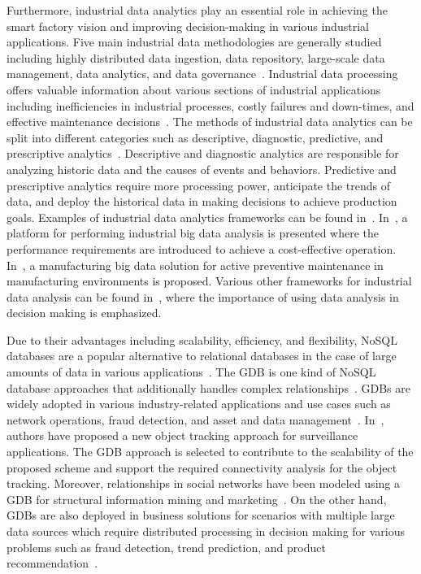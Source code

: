 Furthermore, industrial data analytics play an essential role in achieving the smart factory vision and improving decision-making in various industrial applications. Five main industrial data methodologies are generally studied including highly distributed data ingestion, data repository, large-scale data management, data analytics, and data governance~\cite{DBLP:journals/corr/abs-1807-01016}. Industrial data processing offers valuable information about various sections of industrial applications including inefficiencies in industrial processes, costly failures and down-times, and effective maintenance decisions~\cite{JLee-BigData, Raptis2019}.  The methods of industrial data analytics can be split into different categories such as descriptive, diagnostic, predictive, and prescriptive analytics~\cite{Dai2019}. Descriptive and diagnostic analytics are responsible for analyzing historic data and the causes of events and behaviors. Predictive and prescriptive analytics require more processing power, anticipate the trends of data, and deploy the historical data in making decisions to achieve production goals. Examples of industrial data analytics frameworks can be found in~\cite{GEBigData2019, Wan2017, Courtney2019, ABBBigData2019}. In~\cite{GEBigData2019}, a platform for performing industrial big data analysis is presented where the performance requirements are introduced to achieve a cost-effective operation. In~\cite{Prevent_7857790}, a manufacturing big data solution for active preventive maintenance in manufacturing environments is proposed. Various other frameworks for industrial data analysis can be found in~\cite{Courtney2019, ABBBigData2019}, where the importance of using data analysis in decision making is emphasized.

Due to their advantages including scalability, efficiency, and flexibility, NoSQL databases are a popular alternative to relational databases in the case of large amounts of data in various applications~\cite{doi:10.1108/17440081311316398}. The GDB is one kind of NoSQL database approaches that additionally handles complex relationships~\cite{8123475}. GDBs are widely adopted in various industry-related applications and use cases such as network operations, fraud detection, and asset and data management~\cite{top5}. In~\cite{8721634}, authors have proposed  a new object tracking approach for surveillance applications. The GDB approach is selected to contribute to the scalability of the proposed scheme and support the required connectivity analysis for the object tracking. Moreover, relationships in social networks have been modeled using a GDB for structural information mining and marketing~\cite{Gomez-Rodriguez:2012:IND:2086737.2086741}. On the other hand, GDBs are also deployed in business solutions for scenarios with multiple large data sources which require distributed processing in decision making for various problems such as fraud detection, trend prediction, and product recommendation~\cite{Skhiri2013}. 


